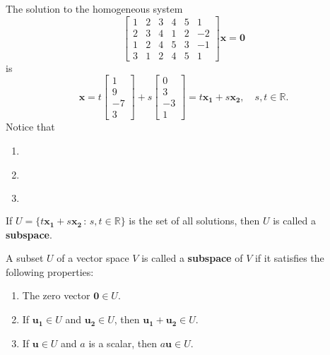 \documentclass[20pt,a4paper]{extarticle}
\newcounter{example}
\newcounter{definition}
\begin{document}
\begin{example}\label{Ex:SolutionHomoSystem}
The solution to the homogeneous system
	\[
		\begin{bmatrix}1 & 2 & 3 & 4 & 5 & 1\\2 & 3 & 4 & 1 & 2 & -2\\1 & 2 & 4 & 5 & 3 & -1\\3 & 1 & 2 & 4 & 5 & 1\end{bmatrix} \mathbf{x} = \mathbf{0} 
	\]
is
	\[
		\mathbf{x} = t \begin{bmatrix} 1 \\ 9 \\ -7 \\ 3 \end{bmatrix} + s \begin{bmatrix} 0 \\ 3 \\ -3 \\ 1 \end{bmatrix} = t \mathbf{x_1} + s \mathbf{x_2} , \quad s, t \in \mathbb{R} .
	\]
Notice that
	\begin{enumerate}[label=\fbox{S\arabic*.}]
		\item {}
		\item {}
			\[
				\phantom{\mathbf{x} + \mathbf{y} = (5 - 3) \mathbf{x_1} + (3 + 2) \mathbf{x_2} = 2 \mathbf{x_1} + 5 \mathbf{x_2}}
			\]
		\item {}
			\[
				\phantom{2 \mathbf{x} = 10 \mathbf{x_1} + 6 \mathbf{x_2}}
			\]
	\end{enumerate}
If $U = \{ t \mathbf{x_1} + s \mathbf{x_2} \, : \, s, t \in \mathbb{R} \}$ is the set of all solutions, then $U$ is called a \textbf{subspace}.
\end{example}

\newpage 

\begin{definition}
A subset $U$ of a vector space $V$ is called a \textbf{subspace} of $V$ if it satisfies the following properties:
	\begin{enumerate}[label=\fbox{S\arabic*.}]
		\item The zero vector $\mathbf{0} \in U$.
		\item If $\mathbf{u_1} \in U$ and $\mathbf{u_2} \in U$, then $\mathbf{u_1} + \mathbf{u_2} \in U$. 
		\item If $\mathbf{u} \in U$ and $a$ is a scalar, then $a\mathbf{u} \in U$. 
	\end{enumerate}
\end{definition}
\end{document}
